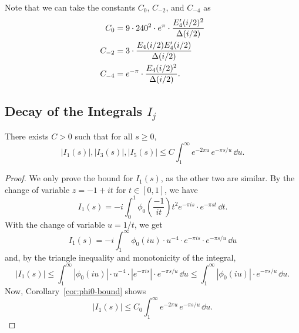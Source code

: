 Note that we can take the constants $C_0$, $C_{-2}$, and $C_{-4}$ as
\begin{align}
    C_0 &= 9 \cdot 240^2 \cdot e^{\pi} \cdot \frac{E_4'(i/2)^{2}}{\Delta(i/2)} \notag \\
    C_{-2} &= 3 \cdot \frac{E_4(i/2) E_4'(i/2)}{\Delta(i/2)} \notag \\
    C_{-4} &= e^{-\pi} \cdot \frac{E_4(i/2)^{2}}{\Delta(i/2)}. \notag
\end{align}

\subsection{Decay of the Integrals $I_j$}

\begin{lemma}\label{lem:bound-I1-I3-I5}\leanok
    There exists $C > 0$ such that for all $s \geq 0$,
    \begin{equation}
        |I_1(s)|, |I_3(s)|, |I_5(s)| \leq C \int_1^{\infty} e^{-2\pi u} \, e^{-\pi s / u} \, \dd u.
    \end{equation}
\end{lemma}
\begin{proof}\leanok
    We only prove the bound for $I_1(s)$, as the other two are similar.
    By the change of variable $z = -1 + i t$ for $t \in [0,1]$, we have
    $$
    I_1(s) = -i \int_0^1 \phi_0\left(\frac{-1}{i t}\right) t^2 e^{-\pi i s} \cdot e^{-\pi s t} \, \dd t.
    $$
    With the change of variable $u = 1 / t$, we get
    $$
    I_1(s) = -i \int_1^{\infty} \phi_0(i u) \cdot u^{-4} \cdot e^{-\pi i s} \cdot e^{-\pi s / u} \, \dd u
    $$
    and, by the triangle inequality and monotonicity of the integral,
    $$
    |I_1(s)| \leq \int_1^{\infty} |\phi_0(i u)| \cdot u^{-4} \cdot |e^{-\pi i s}| \cdot e^{-\pi s / u} \, \dd u \le \int_1^{\infty} |\phi_0(iu)| \cdot e^{-\pi s / u} \, \dd u.
    $$
    Now, Corollary~\ref{cor:phi0-bound} shows
    $$
    |I_1(s)| \leq C_0 \int_1^{\infty} e^{-2\pi u} \, e^{-\pi s / u} \, \dd u.
    $$
\end{proof}

